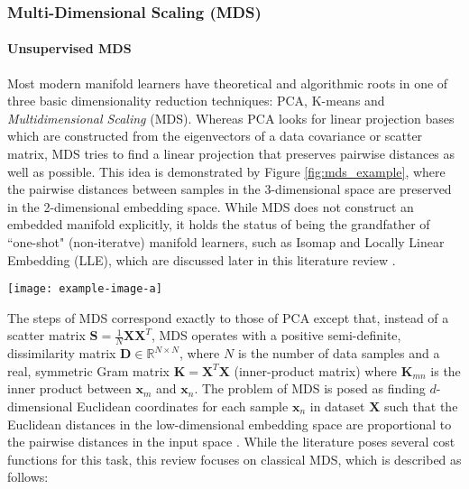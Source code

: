 \subsubsection{Multi-Dimensional Scaling (MDS)} 

\paragraph{Unsupervised MDS} \label{sec:MDS}
Most modern manifold learners have theoretical and algorithmic roots in one of three basic dimensionality reduction techniques: PCA, K-means and \textit{Multidimensional Scaling} (MDS). Whereas PCA looks for linear projection bases which are constructed from the eigenvectors of a data covariance or scatter matrix, MDS tries to find a linear projection that preserves pairwise distances as well as possible. This idea is demonstrated by Figure \ref{fig:mds_example}, where the pairwise distances between samples in the 3-dimensional space are preserved in the 2-dimensional embedding space. While MDS does not construct an embedded manifold explicitly, it holds the status of being the grandfather of ``one-shot" (non-iteratve) manifold learners, such as Isomap and Locally Linear Embedding (LLE), which are discussed later in this literature review \citep{Kegl2008PrincipalManifoldsTextbook}. 
\begin{center}
	\begin{figure*}[h]
		\centering
		\texttt{[image: example-image-a]}
		\caption[Example of MDS distance preservation.]{Example of MDS distance preservation.}
		\label{fig:mds_example}
	\end{figure*}
\end{center}

The steps of MDS correspond exactly to those of PCA except that, instead of a scatter matrix $\bm{S}=\frac{1}{N}\bm{X}\bm{X}^{T}$, MDS operates with a positive semi-definite, dissimilarity matrix $\bm{D} \in \mathbb{R}^{N \times N}$, where $N$ is the number of data samples and a real, symmetric Gram matrix $\bm{K} = \bm{X}^{T}\bm{X}$ (inner-product matrix) where $\bm{K}_{mn}$ is the inner product between $\bm{x}_{m}$ and $\bm{x}_{n}$.  The problem of MDS is posed as finding $d$-dimensional Euclidean coordinates for each sample $\bm{x}_{n}$ in dataset $\bm{X}$ such that the Euclidean distances in the low-dimensional embedding space are proportional to the pairwise distances in the input space \citep{Thorstensen2009ManifoldThesis,Sorzano2014DRReview}. While the literature poses several cost functions for this task, this review focuses on classical MDS, which is described as follows:

